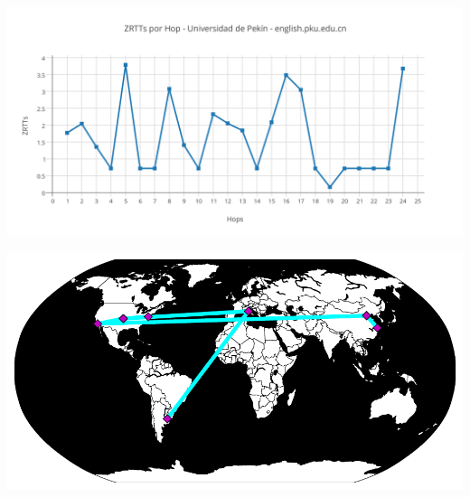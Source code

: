 \includegraphics[scale=0.65]{imagenes/pekin/ZRTTs.png} 

\begin{center}
\includegraphics[scale=0.8]{imagenes/pekin/pekin.pdf} 
\end{center}
